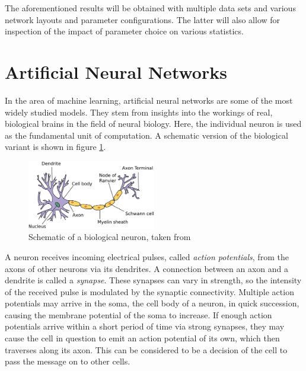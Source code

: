 \documentclass[11pt, a4paper]{article}
\begin{document}
The aforementioned results will be obtained with multiple data sets and various network layouts and parameter configurations. The latter will also allow for inspection of the impact of parameter choice on various statistics.











\newpage
\section{Artificial Neural Networks}
\label{sec:artificial-neural-networks}
In the area of machine learning, artificial neural networks are some of the most widely studied models. They stem from insights into the workings of real, biological brains in the field of neural biology. Here, the individual neuron is used as the fundamental unit of computation. A schematic version of the biological variant is shown in figure \ref{fig:biological-neuron-schematic}.

\begin{figure}[h!tb]
	\centering
	\includegraphics[width=0.5\textwidth]{images/biological_neuron.png}
	\caption[Biological neuron]{Schematic of a biological neuron, taken from \cite{biological-neuron-schematic}}
	\label{fig:biological-neuron-schematic}
\end{figure}

A neuron receives incoming electrical pulses, called \emph{action potentials}, from the axons of other neurons via its dendrites. A connection between an axon and a dendrite is called a \emph{synapse}. These synapses can vary in strength, so the intensity of the received pulse is modulated by the synaptic connectivity. Multiple action potentials may arrive in the soma, the cell body of a neuron, in quick succession, causing the membrane potential of the soma to increase. If enough action potentials arrive within a short period of time via strong synapses, they may cause the cell in question to emit an action potential of its own, which then traverses along its axon. This can be considered to be a decision of the cell to pass the message on to other cells.
\end{document}

